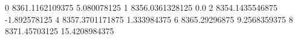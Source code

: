 0 8361.1162109375 5.080078125
1 8356.0361328125 0.0
2 8354.1435546875 -1.892578125
4 8357.3701171875 1.333984375
6 8365.29296875 9.2568359375
8 8371.45703125 15.4208984375
